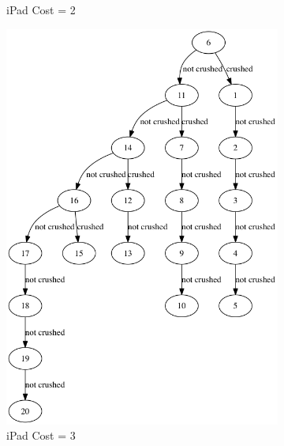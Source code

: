 \documentclass[12pt,a4paper,oneside]{report}
\begin{document}
\begin{figure}[H]
\begin{subfigure}{0.3\textwidth}
		\caption{iPad Cost = 2}
		\label{fig:fixed_cost_2}
	\end{subfigure}
	\begin{subfigure}{0.3\textwidth}
		\includegraphics[width=\textwidth]{fixed_cost_3}
		\caption{iPad Cost = 3}
		\label{fig:fixed_cost_3}
	\end{subfigure}
	\begin{subfigure}{0.3\textwidth}

\end{subfigure}
\end{figure}
\end{document}
